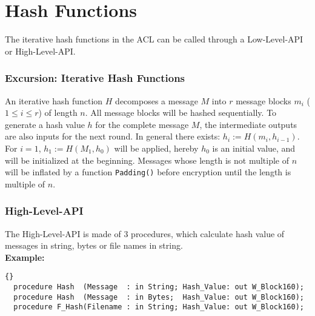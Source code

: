 
\section{Hash Functions}\label{AlgorithmHash}
The iterative hash functions in the ACL can be called through a
Low-Level-API or High-Level-API.
\subsubsection*{Excursion: Iterative Hash Functions}
An iterative hash function $H$ decomposes a message $M$ into $r$
message blocks $m_i$ ($1\leq i \leq r$) of length $n$. All message
blocks will be hashed sequentially. To generate a hash value $h$ for
the complete message $M$, the intermediate outputs are also inputs for
the next round.  In general there exists: $h_i:= H(m_i,h_{i-1})$. For
$i=1$, $h_1:=H(M_1,h_0)$ will be applied, hereby $h_0$ is an initial
value, and will be initialized at the beginning. Messages whose length
is not multiple of $n$ will be inflated by a function
\texttt{Padding()} before encryption until the length is multiple of
$n$.

\subsubsection*{High-Level-API}
The High-Level-API is made of 3 procedures, which calculate hash value
of messages in string, bytes or file names in
string.\\

\noindent\textbf{Example:}
\begin{lstlisting}{}
  procedure Hash  (Message  : in String; Hash_Value: out W_Block160);
  procedure Hash  (Message  : in Bytes;  Hash_Value: out W_Block160);
  procedure F_Hash(Filename : in String; Hash_Value: out W_Block160);
\end{lstlisting}

